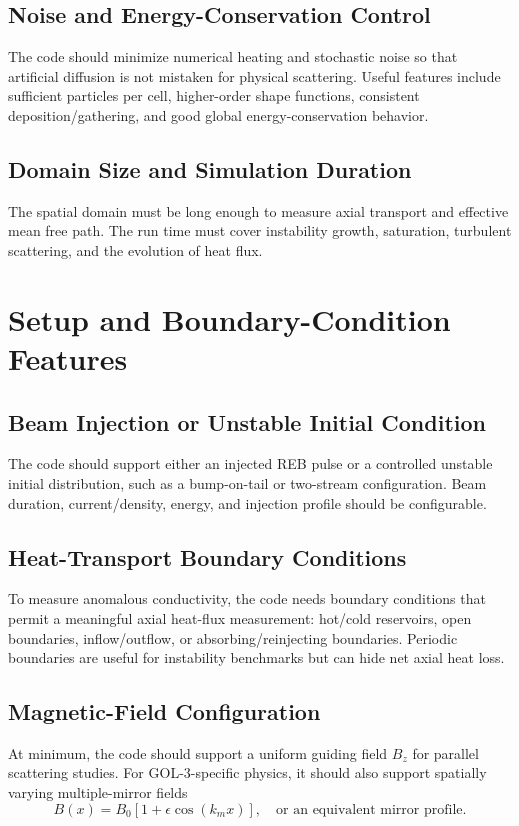 \documentclass[11pt,a4paper]{article}
\begin{document}
\subsection{Noise and Energy-Conservation Control}
The code should minimize numerical heating and stochastic noise so that artificial diffusion is not mistaken for physical scattering. Useful features include sufficient particles per cell, higher-order shape functions, consistent deposition/gathering, and good global energy-conservation behavior.

\subsection{Domain Size and Simulation Duration}
The spatial domain must be long enough to measure axial transport and effective mean free path. The run time must cover instability growth, saturation, turbulent scattering, and the evolution of heat flux.

\section{Setup and Boundary-Condition Features}

\subsection{Beam Injection or Unstable Initial Condition}
The code should support either an injected REB pulse or a controlled unstable initial distribution, such as a bump-on-tail or two-stream configuration. Beam duration, current/density, energy, and injection profile should be configurable.

\subsection{Heat-Transport Boundary Conditions}
To measure anomalous conductivity, the code needs boundary conditions that permit a meaningful axial heat-flux measurement: hot/cold reservoirs, open boundaries, inflow/outflow, or absorbing/reinjecting boundaries. Periodic boundaries are useful for instability benchmarks but can hide net axial heat loss.

\subsection{Magnetic-Field Configuration}
At minimum, the code should support a uniform guiding field $B_z$ for parallel scattering studies. For GOL-3-specific physics, it should also support spatially varying multiple-mirror fields
\begin{equation}
    B(x)=B_0\left[1+\epsilon \cos(k_m x)\right], \quad \text{or an equivalent mirror profile.}
\end{equation}
\end{document}
